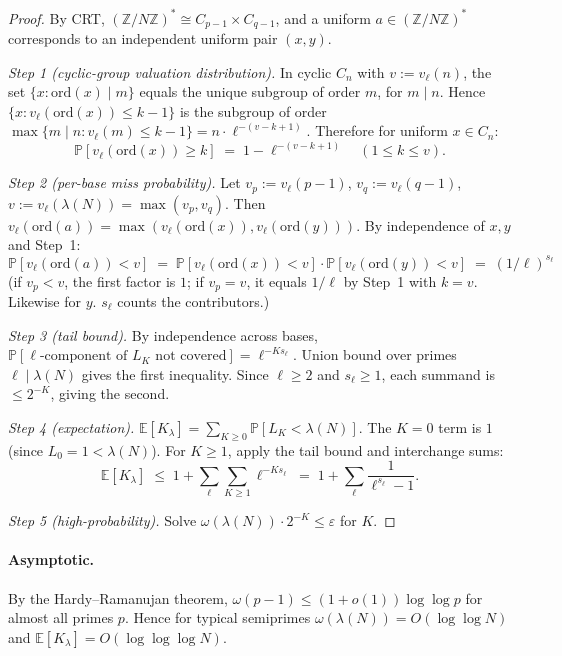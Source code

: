 \documentclass[11pt]{article}
\begin{document}
\begin{proof}
By CRT, $(\mathbb{Z}/N\mathbb{Z})^* \cong C_{p-1} \times C_{q-1}$, and a uniform $a \in (\mathbb{Z}/N\mathbb{Z})^*$ corresponds to an independent uniform pair $(x, y)$.

\emph{Step 1 (cyclic-group valuation distribution).} In cyclic $C_n$ with $v := v_\ell(n)$, the set $\{x : \mathrm{ord}(x) \mid m\}$ equals the unique subgroup of order $m$, for $m \mid n$. Hence $\{x : v_\ell(\mathrm{ord}(x)) \leq k - 1\}$ is the subgroup of order $\max\{m \mid n : v_\ell(m) \leq k - 1\} = n \cdot \ell^{-(v - k + 1)}$. Therefore for uniform $x \in C_n$:
\[
  \mathbb{P}[v_\ell(\mathrm{ord}(x)) \geq k] \;=\; 1 - \ell^{-(v - k + 1)} \quad (1 \leq k \leq v).
\]

\emph{Step 2 (per-base miss probability).} Let $v_p := v_\ell(p-1)$, $v_q := v_\ell(q-1)$, $v := v_\ell(\lambda(N)) = \max(v_p, v_q)$. Then $v_\ell(\mathrm{ord}(a)) = \max(v_\ell(\mathrm{ord}(x)), v_\ell(\mathrm{ord}(y)))$. By independence of $x, y$ and Step~1:
\[
  \mathbb{P}[v_\ell(\mathrm{ord}(a)) < v] \;=\; \mathbb{P}[v_\ell(\mathrm{ord}(x)) < v] \cdot \mathbb{P}[v_\ell(\mathrm{ord}(y)) < v] \;=\; (1/\ell)^{s_\ell}
\]
(if $v_p < v$, the first factor is $1$; if $v_p = v$, it equals $1/\ell$ by Step~1 with $k = v$. Likewise for $y$. $s_\ell$ counts the contributors.)

\emph{Step 3 (tail bound).} By independence across bases, $\mathbb{P}[\text{$\ell$-component of $L_K$ not covered}] = \ell^{-K s_\ell}$. Union bound over primes $\ell \mid \lambda(N)$ gives the first inequality. Since $\ell \geq 2$ and $s_\ell \geq 1$, each summand is $\leq 2^{-K}$, giving the second.

\emph{Step 4 (expectation).} $\mathbb{E}[K_\lambda] = \sum_{K \geq 0} \mathbb{P}[L_K < \lambda(N)]$. The $K = 0$ term is $1$ (since $L_0 = 1 < \lambda(N)$). For $K \geq 1$, apply the tail bound and interchange sums:
\[
  \mathbb{E}[K_\lambda] \;\leq\; 1 + \sum_\ell \sum_{K \geq 1} \ell^{-K s_\ell} \;=\; 1 + \sum_\ell \frac{1}{\ell^{s_\ell} - 1}.
\]

\emph{Step 5 (high-probability).} Solve $\omega(\lambda(N)) \cdot 2^{-K} \leq \varepsilon$ for $K$.
\end{proof}

\paragraph{Asymptotic.} By the Hardy--Ramanujan theorem, $\omega(p-1) \leq (1 + o(1)) \log \log p$ for almost all primes $p$. Hence for typical semiprimes $\omega(\lambda(N)) = O(\log \log N)$ and $\mathbb{E}[K_\lambda] = O(\log \log \log N)$.
\end{document}
